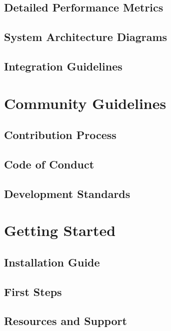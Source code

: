 \documentclass[11pt,a4paper]{article}
\begin{document}
\subsection{Detailed Performance Metrics}
\subsection{System Architecture Diagrams}
\subsection{Integration Guidelines}

\section{Community Guidelines}
\subsection{Contribution Process}
\subsection{Code of Conduct}
\subsection{Development Standards}

\section{Getting Started}
\subsection{Installation Guide}
\subsection{First Steps}
\subsection{Resources and Support}
\end{document}
